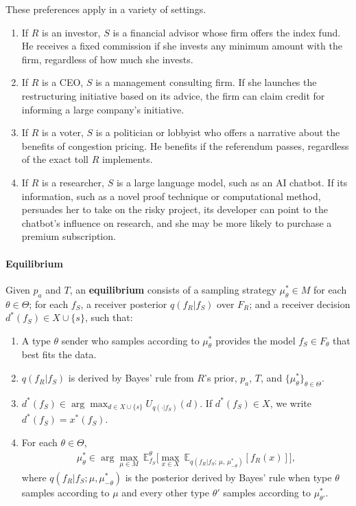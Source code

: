 \documentclass[11pt,dvipsnames]{article}
\begin{document}
These preferences apply in a variety of settings.
\begin{enumerate}
\item If $R$ is an investor, $S$ is a financial advisor whose firm offers the index fund. He receives a fixed commission if she invests any minimum amount with the firm, regardless of how much she invests.
\item If $R$ is a CEO, $S$ is a management consulting firm. If she launches the restructuring initiative based on its advice, the firm can claim credit for informing a large company's initiative.
\item If $R$ is a voter, $S$ is a politician or lobbyist who offers a narrative about the benefits of congestion pricing. He benefits if the referendum passes, regardless of the exact toll $R$ implements.
\item If $R$ is a researcher, $S$ is a large language model, such as an AI chatbot. If its information, such as a novel proof technique or computational method, persuades her to take on the risky project, its developer can point to the chatbot's influence on research, and she may be more likely to purchase a premium subscription.
\end{enumerate}


\paragraph{Equilibrium}
Given $p_a$ and $T$, an \textbf{equilibrium} consists of a sampling strategy $\mu_\theta^* \in M$ for each $\theta\in\Theta$; for each $f_S$, a receiver posterior $q(f_R|f_S)$ over $F_R$; and a receiver decision $d^*(f_S) \in X\cup\{s\}$, such that:
\begin{enumerate}
\item A type $\theta$ sender who samples according to $\mu_\theta^*$ provides the model $f_S \in F_\theta$ that best fits the data.
\item $q(f_R|f_S)$ is derived by Bayes' rule from $R$'s prior, $p_a$, $T$, and $\{\mu_\theta^*\}_{\theta\in\Theta}$.
\item $d^*(f_S) \in \arg\max_{d \in X\cup\{s\}} U_{q(\cdot|f_S)}(d)$. If $d^*(f_S) \in X$, we write $d^*(f_S) = x^*(f_S)$.
\item For each $\theta \in \Theta$,
\begin{align*}
\mu_\theta^* \in \arg\max_{\mu \in M}\ \mathbb{E}_{f_S}^\theta\Big[\max_{x \in X}\ \mathbb{E}_{q(f_R|f_S;\,\mu,\,\mu_{-\theta}^*)}[f_R(x)]\Big],
\end{align*}
where $q(f_R|f_S;\mu,\mu_{-\theta}^*)$ is the posterior derived by Bayes' rule when type $\theta$ samples according to $\mu$ and every other type $\theta'$ samples according to $\mu_{\theta'}^*$.
\end{enumerate}
\end{document}
